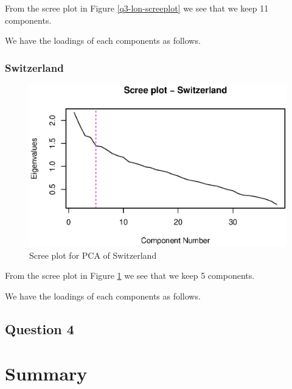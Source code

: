 \documentclass[a4paper]{article}
\begin{document}
From the scree plot in Figure \ref{q3-lon-screeplot} we see that we keep 11 components.

We have the loadings of each components as follows. 



\subsubsection{Switzerland}

\begin{figure}[H]
	\begin{center}
		\includegraphics[width=12cm]{question3output/swiscreeplot.eps} 
	\end{center}
	\caption{Scree plot for PCA of Switzerland}
	\label{q3-swi-screeplot}
\end{figure}

From the scree plot in Figure \ref{q3-swi-screeplot} we see that we keep 5 components.

We have the loadings of each components as follows. 



\subsection{Question 4}

\section{Summary}
\end{document}
